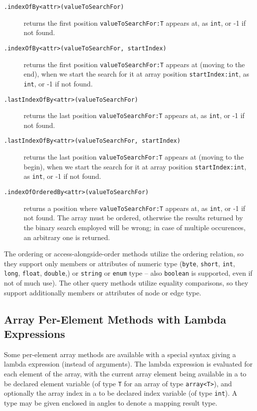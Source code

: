 \begin{description}
\item[\texttt{.indexOfBy<attr>(valueToSearchFor)}] returns the first position \texttt{valueToSearchFor:T} appears at, as \texttt{int}, or -1 if not found.
\item[\texttt{.indexOfBy<attr>(valueToSearchFor, startIndex)}] returns the first position \texttt{valueToSearchFor:T} appears at (moving to the end), when we start the search for it at array position \texttt{startIndex:int}, as \texttt{int}, or -1 if not found.
\item[\texttt{.lastIndexOfBy<attr>(valueToSearchFor)}] returns the last position \texttt{valueToSearchFor:T} appears at, as \texttt{int}, or -1 if not found.
\item[\texttt{.lastIndexOfBy<attr>(valueToSearchFor, startIndex)}] returns the last position \texttt{valueToSearchFor:T} appears at (moving to the begin), when we start the search for it at array position \texttt{startIndex:int}, as \texttt{int}, or -1 if not found.
\item[\texttt{.indexOfOrderedBy<attr>(valueToSearchFor)}] returns a position where \texttt{valueToSearchFor:T} appears at, as \texttt{int}, or -1 if not found. The array must be ordered, otherwise the results returned by the binary search employed will be wrong; in case of multiple occurences, an arbitrary one is returned.
\end{description}

The ordering or access-alongside-order methods utilize the ordering relation, so they support only members or attributes of numeric type (\texttt{byte}, \texttt{short}, \texttt{int}, \texttt{long}, \texttt{float}, \texttt{double},) or \texttt{string} or \texttt{enum} type -- also \texttt{boolean} is supported, even if not of much use).
The other query methods utilize equality comparisons, so they support additionally members or attributes of node or edge type.

\subsection{Array Per-Element Methods with Lambda Expressions} 

Some per-element array methods are available with a special syntax giving a lambda expression (instead of arguments).
The lambda expression is evaluated for each element of the array, with the current array element being available in a to be declared element variable (of type \texttt{T} for an array of type \texttt{array<T>}), and optionally the array index in a to be declared index variable (of type \texttt{int}).
A type may be given enclosed in angles to denote a mapping result type.

